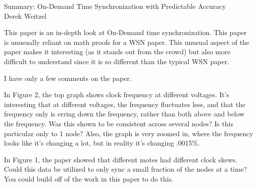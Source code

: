 \documentclass[12pt]{article}
\begin{document}
\begin{center}
{\huge Summary: On-Demand Time Synchronization with Predictable Accuracy } \\
Derek Weitzel
\end{center}

This paper is an in-depth look at On-Demand time synchronization.  This paper is unusually reliant on math proofs for a WSN paper.  This unusual aspect of the paper makes it interesting (as it stands out from the crowd) but also more difficult to understand since it is so different than the typical WSN paper.

I have only a few comments on the paper.

In Figure 2, the top graph shows clock frequency at different voltages.  It's interesting that at different voltages, the frequency fluctuates less, and that the frequency only is erring down the frequency, rather than both above and below the frequency.  Was this shown to be consistent across several nodes?  Is this particular only to 1 node?  Also, the graph is very zoomed in, where the frequency looks like it's changing a lot, but in reality it's changing {.0015\%}.

In Figure 1, the paper showed that different motes had different clock skews.  Could this data be utilized to only sync a small fraction of the nodes at a time?  You could build off of the work in this paper to do this.
\end{document}
